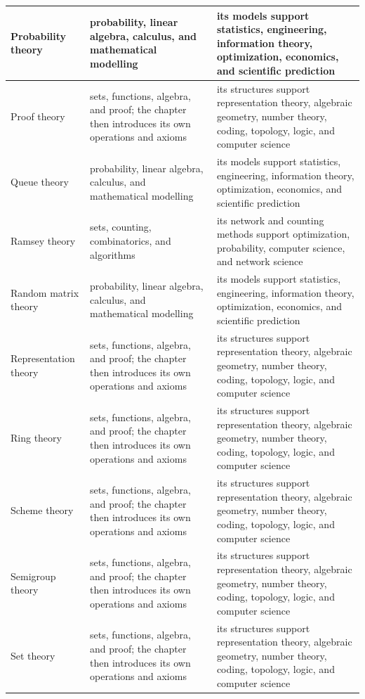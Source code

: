 \documentclass[11pt,oneside]{book}
\begin{document}
\begin{longtable}{>{\raggedright\arraybackslash}p{}>{\raggedright\arraybackslash}p{}>{\raggedright\arraybackslash}p{}}
\hline
Probability theory & probability, linear algebra, calculus, and mathematical modelling & its models support statistics, engineering, information theory, optimization, economics, and scientific prediction\\
\hline
Proof theory & sets, functions, algebra, and proof; the chapter then introduces its own operations and axioms & its structures support representation theory, algebraic geometry, number theory, coding, topology, logic, and computer science\\
\hline
Queue theory & probability, linear algebra, calculus, and mathematical modelling & its models support statistics, engineering, information theory, optimization, economics, and scientific prediction\\
\hline
Ramsey theory & sets, counting, combinatorics, and algorithms & its network and counting methods support optimization, probability, computer science, and network science\\
\hline
Random matrix theory & probability, linear algebra, calculus, and mathematical modelling & its models support statistics, engineering, information theory, optimization, economics, and scientific prediction\\
\hline
Representation theory & sets, functions, algebra, and proof; the chapter then introduces its own operations and axioms & its structures support representation theory, algebraic geometry, number theory, coding, topology, logic, and computer science\\
\hline
Ring theory & sets, functions, algebra, and proof; the chapter then introduces its own operations and axioms & its structures support representation theory, algebraic geometry, number theory, coding, topology, logic, and computer science\\
\hline
Scheme theory & sets, functions, algebra, and proof; the chapter then introduces its own operations and axioms & its structures support representation theory, algebraic geometry, number theory, coding, topology, logic, and computer science\\
\hline
Semigroup theory & sets, functions, algebra, and proof; the chapter then introduces its own operations and axioms & its structures support representation theory, algebraic geometry, number theory, coding, topology, logic, and computer science\\
\hline
Set theory & sets, functions, algebra, and proof; the chapter then introduces its own operations and axioms & its structures support representation theory, algebraic geometry, number theory, coding, topology, logic, and computer science\\

\end{longtable}
\end{document}
